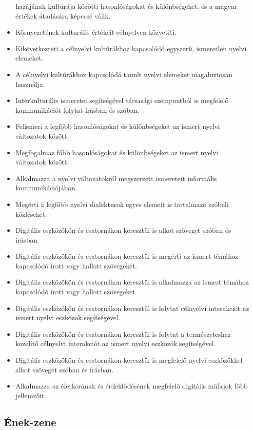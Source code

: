\begin{itemize}
  hazájának kultúrája közötti hasonlóságokat és különbségeket, és a
  magyar értékek átadására képessé válik.
\item
  Környezetének kulturális értékeit célnyelven közvetíti.
\item
  Kikövetkezteti a célnyelvi kultúrákhoz kapcsolódó egyszerű, ismeretlen
  nyelvi elemeket.
\item
  A célnyelvi kultúrákhoz kapcsolódó tanult nyelvi elemeket magabiztosan
  használja.
\item
  Interkulturális ismeretei segítségével társasági szempontból is
  megfelelő kommunikációt folytat írásban és szóban.
\item
  Felismeri a legfőbb hasonlóságokat és különbségeket az ismert nyelvi
  változatok között.
\item
  Megfogalmaz főbb hasonlóságokat és különbségeket az ismert nyelvi
  változatok között.
\item
  Alkalmazza a nyelvi változatokról megszerzett ismereteit informális
  kommunikációjában.
\item
  Megérti a legfőbb nyelvi dialektusok egyes elemeit is tartalmazó
  szóbeli közléseket.
\item
  Digitális eszközökön és csatornákon keresztül is alkot szöveget szóban
  és írásban.
\item
  Digitális eszközökön és csatornákon keresztül is megérti az ismert
  témához kapcsolódó írott vagy hallott szövegeket.
\item
  Digitális eszközökön és csatornákon keresztül is alkalmazza az ismert
  témához kapcsolódó írott vagy hallott szövegeket.
\item
  Digitális eszközökön és csatornákon keresztül is folytat célnyelvi
  interakciót az ismert nyelvi eszközök segítségével.
\item
  Digitális eszközökön és csatornákon keresztül is folytat a
  természeteshez közelítő célnyelvi interakciót az ismert nyelvi
  eszközök segítségével.
\item
  Digitális eszközökön és csatornákon keresztül is megfelelő nyelvi
  eszközökkel alkot szöveget szóban és írásban.
\item
  Alkalmazza az életkorának és érdeklődésének megfelelő digitális
  műfajok főbb jellemzőit.
\end{itemize}

\hypertarget{enek-zene}{%
\subsection{Ének-zene}\label{enek-zene}}

